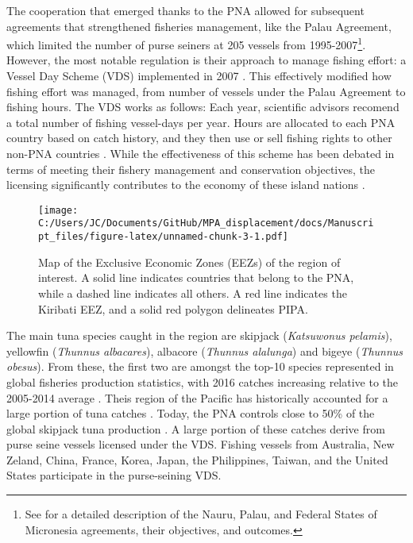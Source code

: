 \documentclass[11pt,]{article}
\let\rmarkdownfootnote\footnote%
\def\footnote{\protect\rmarkdownfootnote}
\begin{document}
The cooperation that emerged thanks to the PNA allowed for subsequent
agreements that strengthened fisheries management, like the Palau
Agreement, which limited the number of purse seiners at 205 vessels from
1995-2007\footnote{See \citet{havice_2010} for a detailed description of
  the Nauru, Palau, and Federal States of Micronesia agreements, their
  objectives, and outcomes.}. However, the most notable regulation is
their approach to manage fishing effort: a Vessel Day Scheme (VDS)
implemented in 2007 \citep{havice_2013}. This effectively modified how
fishing effort was managed, from number of vessels under the Palau
Agreement to fishing hours. The VDS works as follows: Each year,
scientific advisors recomend a total number of fishing vessel-days per
year. Hours are allocated to each PNA country based on catch history,
and they then use or sell fishing rights to other non-PNA countries
\citep{aqorau_2018}. While the effectiveness of this scheme has been
debated in terms of meeting their fishery management and conservation
objectives, the licensing significantly contributes to the economy of
these island nations \citep{havice_2010}.

\begin{figure}
\centering
\texttt{[image: C:/Users/JC/Documents/GitHub/MPA\_displacement/docs/Manuscript\_files/figure-latex/unnamed-chunk-3-1.pdf]}
\caption{\label{fig:unnamed-chunk-3}\label{fig:PNA_map}Map of the Exclusive
Economic Zones (EEZs) of the region of interest. A solid line indicates
countries that belong to the PNA, while a dashed line indicates all
others. A red line indicates the Kiribati EEZ, and a solid red polygon
delineates PIPA.}
\end{figure}

The main tuna species caught in the region are skipjack
(\emph{Katsuwonus pelamis}), yellowfin (\emph{Thunnus albacares}),
albacore (\emph{Thunnus alalunga}) and bigeye (\emph{Thunnus obesus}).
From these, the first two are amongst the top-10 species represented in
global fisheries production statistics, with 2016 catches increasing
relative to the 2005-2014 average \citep{fao_2018}. Theis region of the
Pacific has historically accounted for a large portion of tuna catches
\citep{aqorau_1997}. Today, the PNA controls close to 50\% of the global
skipjack tuna production \citep{pna_website_2018}. A large portion of
these catches derive from purse seine vessels licensed under the VDS.
Fishing vessels from Australia, New Zeland, China, France, Korea, Japan,
the Philippines, Taiwan, and the United States participate in the
purse-seining VDS.
\end{document}
